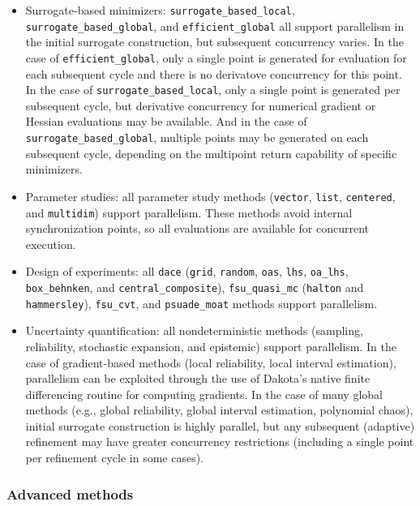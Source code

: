 \begin{itemize}
\item Surrogate-based minimizers: \texttt{surrogate\_based\_local},
  \texttt{surrogate\_based\_global}, and \texttt{efficient\_global}
  all support parallelism in the initial surrogate construction, but
  subsequent concurrency varies.  In the case of
  \texttt{efficient\_global}, only a single point is generated for
  evaluation for each subsequent cycle and there is no derivatove
  concurrency for this point.  In the case of
  \texttt{surrogate\_based\_local}, only a single point is generated
  per subsequent cycle, but derivative concurrency for numerical
  gradient or Hessian evaluations may be available.  And in the case
  of \texttt{surrogate\_based\_global}, multiple points may be
  generated on each subsequent cycle, depending on the multipoint
  return capability of specific minimizers.

\item Parameter studies: all parameter study methods (\texttt{vector},
  \texttt{list}, \texttt{centered}, and \texttt{multidim}) support
  parallelism. These methods avoid internal synchronization points, so
  all evaluations are available for concurrent execution.

\item Design of experiments: all \texttt{dace} (\texttt{grid},
  \texttt{random}, \texttt{oas}, \texttt{lhs}, \texttt{oa\_lhs},
  \texttt{box\_behnken}, and \texttt{central\_composite}),
  \texttt{fsu\_quasi\_mc} (\texttt{halton} and \texttt{hammersley}),
  \texttt{fsu\_cvt}, and \texttt{psuade\_moat} methods support
  parallelism.

\item Uncertainty quantification: all nondeterministic methods
  (sampling, reliability, stochastic expansion, and epistemic) support
  parallelism. In the case of gradient-based methods (local
  reliability, local interval estimation), parallelism can be exploited
  through the use of Dakota's native finite differencing routine for
  computing gradients.  In the case of many global methods (e.g.,
  global reliability, global interval estimation, polynomial chaos),
  initial surrogate construction is highly parallel, but any subsequent
  (adaptive) refinement may have greater concurrency restrictions
  (including a single point per refinement cycle in some cases).
\end{itemize}

\subsubsection{Advanced methods}\label{parallel:algorithms:adv_meth}

